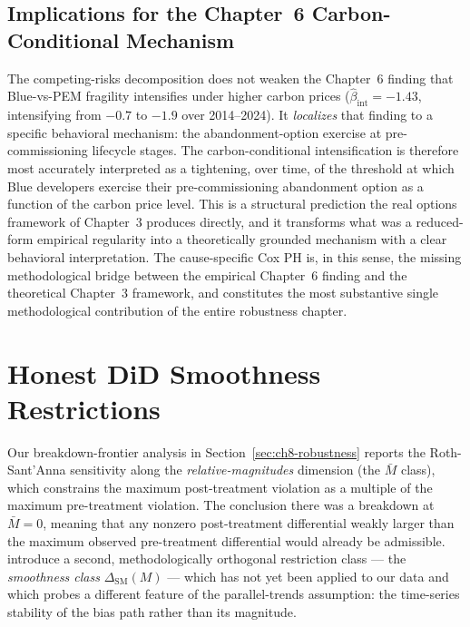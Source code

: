 \documentclass[11pt,a4paper]{article}
\begin{document}
\subsection{Implications for the Chapter~6 Carbon-Conditional Mechanism}

The competing-risks decomposition does not weaken the Chapter~6 finding that Blue-vs-PEM fragility intensifies under higher carbon prices ($\hat\beta_{\mathrm{int}} = -1.43$, intensifying from $-0.7$ to $-1.9$ over 2014--2024). It \emph{localizes} that finding to a specific behavioral mechanism: the abandonment-option exercise at pre-commissioning lifecycle stages. The carbon-conditional intensification is therefore most accurately interpreted as a tightening, over time, of the threshold at which Blue developers exercise their pre-commissioning abandonment option as a function of the carbon price level. This is a structural prediction the real options framework of Chapter~3 produces directly, and it transforms what was a reduced-form empirical regularity into a theoretically grounded mechanism with a clear behavioral interpretation. The cause-specific Cox PH is, in this sense, the missing methodological bridge between the empirical Chapter~6 finding and the theoretical Chapter~3 framework, and constitutes the most substantive single methodological contribution of the entire robustness chapter.




\section{Honest DiD Smoothness Restrictions}
\label{sec:ch8-smoothness}

Our breakdown-frontier analysis in Section~\ref{sec:ch8-robustness} reports the Roth-Sant'Anna sensitivity along the \emph{relative-magnitudes} dimension (the $\bar{M}$ class), which constrains the maximum post-treatment violation as a multiple of the maximum pre-treatment violation. The conclusion there was a breakdown at $\bar{M}=0$, meaning that any nonzero post-treatment differential weakly larger than the maximum observed pre-treatment differential would already be admissible. \citet{rambachan2023more} introduce a second, methodologically orthogonal restriction class — the \emph{smoothness class} $\Delta_{\mathrm{SM}}(M)$ — which has not yet been applied to our data and which probes a different feature of the parallel-trends assumption: the time-series stability of the bias path rather than its magnitude.
\end{document}
